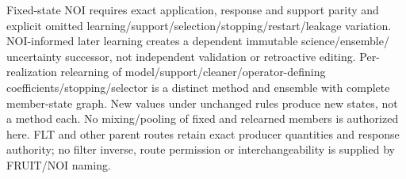 {{Fixed-state NOI requires exact application, response and support parity and
explicit omitted learning/support/selection/stopping/restart/leakage variation.
NOI-informed later learning creates a dependent immutable science/ensemble/
uncertainty successor, not independent validation or retroactive editing.
Per-realization relearning of model/support/cleaner/operator-defining coefficients/stopping/selector
is a distinct method and ensemble with complete member-state graph. New values
under unchanged rules produce new states, not a method each. No mixing/pooling
of fixed and relearned members is authorized here. FLT and other parent routes
retain exact producer quantities and response authority; no filter inverse,
route permission or interchangeability is supplied by FRUIT/NOI naming.
}}


\newcommand{\EqPTC}{\begin{equation}\begin{aligned}
G^{\rm app}_{g,t}&=\widehat A_g^{\mathsf T}W^{\rm app}_{g,t}\widehat A_g,
&\widehat m^{\rm app}_{g,t}(x)&=x_{g,t}W^{\rm app}_{g,t}\widehat A_g(G^{\rm app}_{g,t})^+,\\
P^{\rm PTC}_{g,t,\Theta}&=I-W^{\rm app}_{g,t}\widehat A_g(G^{\rm app}_{g,t})^+\widehat A_g^{\mathsf T},\\
z_{g,t}&=x_{g,t}-\widehat m^{\rm app}_{g,t}(x)\widehat A_g^{\mathsf T}
=x_{g,t}P^{\rm PTC}_{g,t,\Theta},
&\delta z_{g,t}&=\delta x_{g,t}P^{\rm PTC}_{g,t,\Theta}.
\end{aligned}\label{eq:ptc-map}\end{equation}}
\newcommand{\EqPTCAffine}{\begin{equation}\begin{aligned}
x_{g,t}&=Y^{\rm CAL}_{g,t}-\lambda_g,\\
z_{g,t}&=(Y^{\rm CAL}_{g,t}-\lambda_g)P^{\rm PTC}_{g,t,\Theta},
&\mathrm D_Yz[H]&=HP^{\rm PTC}_{g,t,\Theta}.
\end{aligned}\label{eq:ptc-affine}\end{equation}}
